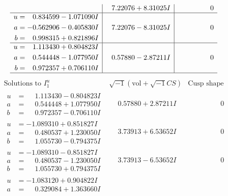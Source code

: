 \documentclass[1p]{elsarticle_modified}
\theoremstyle{definition}
\newcommand{\I}{\sqrt{-1}}
\begin{document}
$$\begin{array}{c|c|c}
 & \phantom{-}7.22076 + 8.31025 I & \phantom{-0.000000 } 0 \\ \hline\begin{aligned}
u &= \phantom{-}0.834599 - 1.071090 I \\
a &= -0.562906 - 0.405830 I \\
b &= \phantom{-}0.998315 + 0.821896 I\end{aligned}
 & \phantom{-}7.22076 - 8.31025 I & \phantom{-0.000000 } 0 \\ \hline\begin{aligned}
u &= \phantom{-}1.113430 + 0.804823 I \\
a &= \phantom{-}0.544448 - 1.077950 I \\
b &= \phantom{-}0.972357 + 0.706110 I\end{aligned}
 & \phantom{-}0.57880 - 2.87211 I & \phantom{-0.000000 } 0\\
 \hline 
 \end{array}$$\newpage$$\begin{array}{c|c|c}  
\text{Solutions to }I^u_{1}& \I (\text{vol} + \sqrt{-1}CS) & \text{Cusp shape}\\
 \hline 
\begin{aligned}
u &= \phantom{-}1.113430 - 0.804823 I \\
a &= \phantom{-}0.544448 + 1.077950 I \\
b &= \phantom{-}0.972357 - 0.706110 I\end{aligned}
 & \phantom{-}0.57880 + 2.87211 I & \phantom{-0.000000 } 0 \\ \hline\begin{aligned}
u &= -1.089310 + 0.851827 I \\
a &= \phantom{-}0.480537 + 1.230050 I \\
b &= \phantom{-}1.055730 - 0.794375 I\end{aligned}
 & \phantom{-}3.73913 + 6.53652 I & \phantom{-0.000000 } 0 \\ \hline\begin{aligned}
u &= -1.089310 - 0.851827 I \\
a &= \phantom{-}0.480537 - 1.230050 I \\
b &= \phantom{-}1.055730 + 0.794375 I\end{aligned}
 & \phantom{-}3.73913 - 6.53652 I & \phantom{-0.000000 } 0 \\ \hline\begin{aligned}
u &= -1.083120 + 0.904822 I \\
a &= \phantom{-}0.329084 + 1.363660 I \\

\end{aligned}
\end{array}$$
\end{document}
